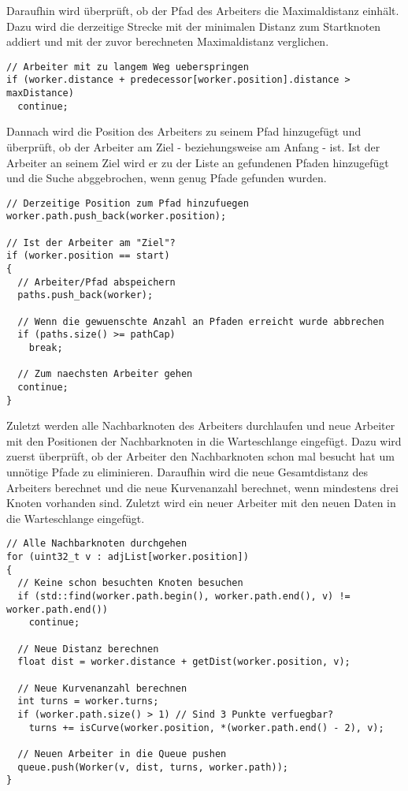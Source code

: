 \documentclass[a4paper,10pt,ngerman]{scrartcl}
\begin{document}
Daraufhin wird überprüft, ob der Pfad des Arbeiters die Maximaldistanz einhält. Dazu wird die derzeitige Strecke mit der minimalen Distanz zum Startknoten addiert
und mit der zuvor berechneten Maximaldistanz verglichen.

\begin{lstlisting}[frame=single]
// Arbeiter mit zu langem Weg ueberspringen
if (worker.distance + predecessor[worker.position].distance > maxDistance)
  continue;
\end{lstlisting}

Dannach wird die Position des Arbeiters zu seinem Pfad hinzugefügt und überprüft, ob der Arbeiter am Ziel - beziehungsweise am Anfang - ist. Ist der Arbeiter an seinem
Ziel wird er zu der Liste an gefundenen Pfaden hinzugefügt und die Suche abggebrochen, wenn genug Pfade gefunden wurden.

\begin{lstlisting}[frame=single]
// Derzeitige Position zum Pfad hinzufuegen
worker.path.push_back(worker.position);

// Ist der Arbeiter am "Ziel"?
if (worker.position == start)
{
  // Arbeiter/Pfad abspeichern
  paths.push_back(worker);
  
  // Wenn die gewuenschte Anzahl an Pfaden erreicht wurde abbrechen
  if (paths.size() >= pathCap)
    break;

  // Zum naechsten Arbeiter gehen
  continue;
}
\end{lstlisting}

Zuletzt werden alle Nachbarknoten des Arbeiters durchlaufen und neue Arbeiter mit den Positionen der Nachbarknoten in die Warteschlange eingefügt.
Dazu wird zuerst überprüft, ob der Arbeiter den Nachbarknoten schon mal besucht hat um unnötige Pfade zu eliminieren. Daraufhin wird die neue Gesamtdistanz des
Arbeiters berechnet und die neue Kurvenanzahl berechnet, wenn mindestens drei Knoten vorhanden sind. Zuletzt wird ein neuer Arbeiter mit den neuen Daten in die
Warteschlange eingefügt.

\begin{lstlisting}[frame=single]
// Alle Nachbarknoten durchgehen
for (uint32_t v : adjList[worker.position])
{
  // Keine schon besuchten Knoten besuchen
  if (std::find(worker.path.begin(), worker.path.end(), v) != worker.path.end())
    continue;

  // Neue Distanz berechnen
  float dist = worker.distance + getDist(worker.position, v);

  // Neue Kurvenanzahl berechnen
  int turns = worker.turns;
  if (worker.path.size() > 1) // Sind 3 Punkte verfuegbar?
    turns += isCurve(worker.position, *(worker.path.end() - 2), v);

  // Neuen Arbeiter in die Queue pushen
  queue.push(Worker(v, dist, turns, worker.path));
}
\end{lstlisting}
\end{document}
